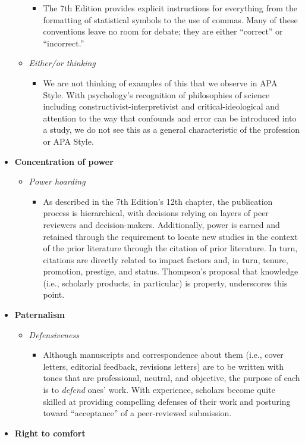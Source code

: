 \documentclass[
  11pt,
]{book}
\providecommand{\tightlist}{%
  \setlength{\itemsep}{0pt}\setlength{\parskip}{0pt}}
\begin{document}
\begin{itemize}
\begin{itemize}
    \begin{itemize}
    \tightlist
    \item
      The 7th Edition provides explicit instructions for everything from the formatting of statistical symbols to the use of commas. Many of these conventions leave no room for debate; they are either ``correct'' or ``incorrect.''
    \end{itemize}
  \item
    \emph{Either/or thinking}

    \begin{itemize}
    \tightlist
    \item
      We are not thinking of examples of this that we observe in APA Style. With psychology's recognition of philosophies of science including constructivist-interpretivist and critical-ideological and attention to the way that confounds and error can be introduced into a study, we do not see this as a general characteristic of the profession or APA Style.
    \end{itemize}
  \end{itemize}
\item
  \textbf{Concentration of power}

  \begin{itemize}
  \tightlist
  \item
    \emph{Power hoarding}

    \begin{itemize}
    \tightlist
    \item
      As described in the 7th Edition's 12th chapter, the publication process is hierarchical, with decisions relying on layers of peer reviewers and decision-makers. Additionally, power is earned and retained through the requirement to locate new studies in the context of the prior literature through the citation of prior literature. In turn, citations are directly related to impact factors and, in turn, tenure, promotion, prestige, and status. Thompson's \citeyearpar{thompson_gentlemanly_2004} proposal that knowledge (i.e., scholarly products, in particular) is property, underscores this point.
    \end{itemize}
  \end{itemize}
\item
  \textbf{Paternalism}

  \begin{itemize}
  \tightlist
  \item
    \emph{Defensiveness}

    \begin{itemize}
    \tightlist
    \item
      Although manuscripts and correspondence about them (i.e., cover letters, editorial feedback, revisions letters) are to be written with tones that are professional, neutral, and objective, the purpose of each is to \emph{defend} ones' work. With experience, scholars become quite skilled at providing compelling defenses of their work and posturing toward ``acceptance'' of a peer-reviewed submission.
    \end{itemize}
  \end{itemize}
\item
  \textbf{Right to comfort}


\end{itemize}
\end{document}
